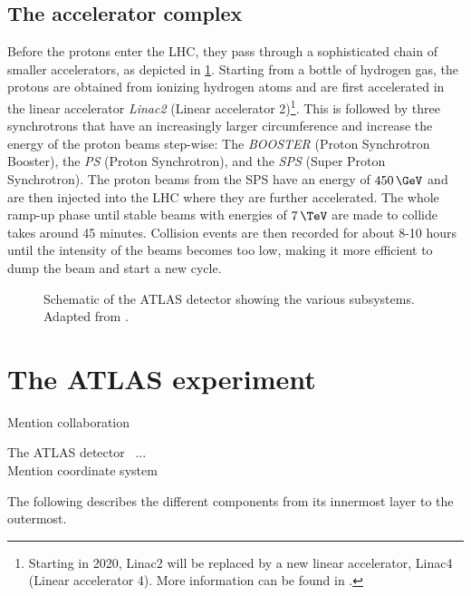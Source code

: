 \subsection{The accelerator complex}
Before the protons enter the LHC, they pass through a sophisticated chain of smaller accelerators, as depicted in \cref{fig:accelerator-complex}.
Starting from a bottle of hydrogen gas, the protons are obtained from ionizing hydrogen atoms and are first accelerated in the linear accelerator \emph{Linac2} (Linear accelerator 2)\footnote{Starting in 2020, Linac2 will be replaced by a new linear accelerator, Linac4 (Linear accelerator 4). More information can be found in .}. This is followed by three synchrotrons that have an increasingly larger circumference and increase the energy of the proton beams step-wise: The \emph{BOOSTER} (Proton Synchrotron Booster), the \emph{PS} (Proton Synchrotron), and the \emph{SPS} (Super Proton Synchrotron). The proton beams from the SPS have an energy of $450\,\GeV$ and are then injected into the LHC where they are further accelerated. The whole ramp-up phase until stable beams with energies of $7\,\TeV$ are made to collide takes around 45 minutes. Collision events are then recorded for about 8-10 hours until the intensity of the beams becomes too low, making it more efficient to dump the beam and start a new cycle.

\begin{figure}
    \caption[Schematic of the ATLAS detector showing the various subsystems.]{Schematic of the ATLAS detector showing the various subsystems. Adapted from .}
    \label{fig:accelerator-complex}
\end{figure}









\section{The ATLAS experiment}

Mention collaboration

The ATLAS detector~\cite{PERF-2007-01} ... \\

Mention coordinate system

The following describes the different components from its innermost layer to the outermost.

